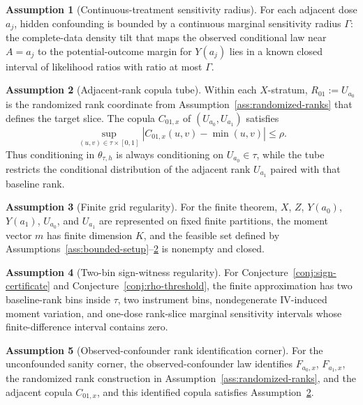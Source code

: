\documentclass[11pt]{article}
\theoremstyle{definition}
\newtheorem{assumption}{Assumption}
\theoremstyle{plain}
\theoremstyle{remark}
\begin{document}
\begin{assumption}[Continuous-treatment sensitivity radius]\label{ass:cmsm}
For each adjacent dose \(a_j\), hidden confounding is bounded by a continuous marginal sensitivity radius \(\Gamma\): the complete-data density tilt that maps the observed conditional law near \(A=a_j\) to the potential-outcome margin for \(Y(a_j)\) lies in a known closed interval of likelihood ratios with ratio at most \(\Gamma\).
\end{assumption}

\begin{assumption}[Adjacent-rank copula tube]\label{ass:copula-tube}
Within each \(X\)-stratum, \(R_{01}:=U_{a_0}\) is the randomized rank coordinate from Assumption~\ref{ass:randomized-ranks} that defines the target slice.  The copula \(C_{01,x}\) of \((U_{a_0},U_{a_1})\) satisfies
\[
\sup_{(u,v)\in\tau\times[0,1]}|C_{01,x}(u,v)-\min(u,v)|\le\rho.
\]
Thus conditioning in \(\theta_{\tau,h}\) is always conditioning on \(U_{a_0}\in\tau\), while the tube restricts the conditional distribution of the adjacent rank \(U_{a_1}\) paired with that baseline rank.
\end{assumption}

\begin{assumption}[Finite grid regularity]\label{ass:finite-grid}
For the finite theorem, \(X\), \(Z\), \(Y(a_0)\), \(Y(a_1)\), \(U_{a_0}\), and \(U_{a_1}\) are represented on fixed finite partitions, the moment vector \(m\) has finite dimension \(K\), and the feasible set defined by Assumptions~\ref{ass:bounded-setup}--\ref{ass:copula-tube} is nonempty and closed.
\end{assumption}

\begin{assumption}[Two-bin sign-witness regularity]\label{ass:two-bin-witness}
For Conjecture~\ref{conj:sign-certificate} and Conjecture~\ref{conj:rho-threshold}, the finite approximation has two baseline-rank bins inside \(\tau\), two instrument bins, nondegenerate IV-induced moment variation, and one-dose rank-slice marginal sensitivity intervals whose finite-difference interval contains zero.
\end{assumption}

\begin{assumption}[Observed-confounder rank identification corner]\label{ass:rank-id-corner}
For the unconfounded sanity corner, the observed-confounder law identifies \(F_{a_0,x}\), \(F_{a_1,x}\), the randomized rank construction in Assumption~\ref{ass:randomized-ranks}, and the adjacent copula \(C_{01,x}\), and this identified copula satisfies Assumption~\ref{ass:copula-tube}.
\end{assumption}
\end{document}
